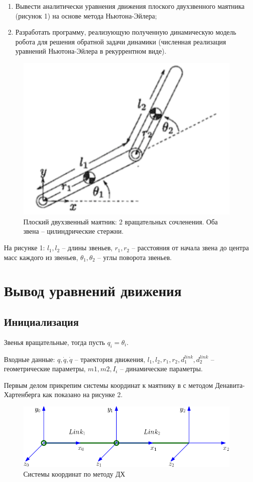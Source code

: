 \documentclass[a4paper,14pt]{extreport}
\begin{document}
\begin{enumerate}
	\item Вывести аналитически уравнения движения плоского двухзвенного маятника (рисунок 1) на основе метода Ньютона-Эйлера;
	\item Разработать программу, реализующую полученную динамическую
	модель робота для решения обратной задачи динамики (численная реализация уравнений Ньютона-Эйлера в рекуррентном виде).
\end{enumerate}

\begin{figure}[H]
	\center\includegraphics[width=0.5\linewidth]{images/1.png}
	\caption{Плоский двухзвенный маятник: 2 вращательных сочленения. Оба звена -- цилиндрические стержни.}
	\label{fig:scr1}
\end{figure}
На рисунке 1: $l_1, l_2$ -- длины звеньев, $r_1, r_2$ -- расстояния от начала звена до центра масс каждого из звеньев, $\theta_1, \theta_2$ -- углы поворота звеньев.


\section{Вывод уравнений движения}

\subsection{Инициализация}

Звенья вращательные, тогда пусть $q_i = \theta_i$.

Входные данные: $q, \dot q, \dot q$ -- траектория движения, $l_1, l_2, r_1, r_2, d^{link}_1,  d^{link}_2$ -- геометрические параметры, $m1, m2, I_i$ -- динамические параметры.

Первым делом прикрепим системы координат к маятнику в  с методом Денавита-Хартенберга как показано на рисунке 2.

\begin{figure}[H]
	\center\includegraphics[width=0.8\linewidth]{images/2.png}
	\caption{Системы координат по методу ДХ}
	\label{fig:scr1}
\end{figure}
\end{document}
